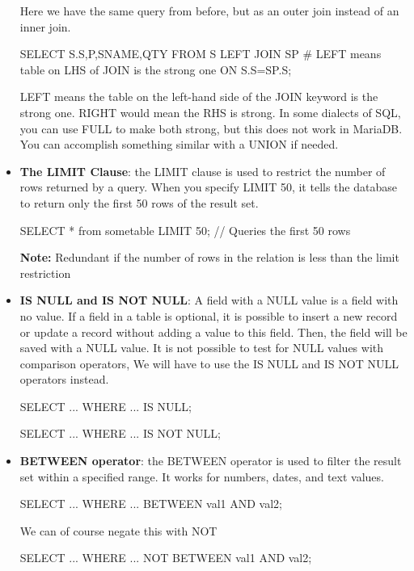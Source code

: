 \documentclass{report}
\begin{document}
\begin{itemize}
            Here we have the same query from before, but as an outer join instead of an inner join.
            \bigbreak \noindent 
            \begin{sqlcode}
                SELECT S.S,P,SNAME,QTY
                    FROM S LEFT JOIN SP # LEFT means table on LHS of JOIN is the strong one
                    ON S.S=SP.S;
            \end{sqlcode}
            \bigbreak \noindent 
            LEFT means the table on the left-hand side of the JOIN keyword is the strong one. RIGHT would mean the RHS is strong. In some dialects of SQL, you can use FULL to make both strong, but this does not work in MariaDB. You can accomplish something similar with a UNION if needed.
        \item \textbf{The LIMIT Clause}: the LIMIT clause is used to restrict the number of rows returned by a query. When you specify LIMIT 50, it tells the database to return only the first 50 rows of the result set.
            \bigbreak \noindent 
            \begin{sqlcode}
            SELECT * from sometable LIMIT 50; // Queries the first 50 rows
            \end{sqlcode}
            \bigbreak \noindent 
            \textbf{Note:} Redundant if the number of rows in the relation is less than the limit restriction
        \item \textbf{IS NULL and IS NOT NULL}: A field with a NULL value is a field with no value.
            \bigbreak \noindent 
            If a field in a table is optional, it is possible to insert a new record or update a record without adding a value to this field. Then, the field will be saved with a NULL value.
            \bigbreak \noindent 
            It is not possible to test for NULL values with comparison operators, We will have to use the IS NULL and IS NOT NULL operators instead.
            \bigbreak \noindent 
            \begin{sqlcode}
            SELECT ...
                WHERE ... IS NULL;

            SELECT ...
                WHERE ... IS NOT NULL;
            \end{sqlcode}
        \item \textbf{BETWEEN operator}: the BETWEEN operator is used to filter the result set within a specified range. It works for numbers, dates, and text values.
            \bigbreak \noindent 
            \begin{sqlcode}
            SELECT ...
                WHERE ... BETWEEN val1 AND val2;
            \end{sqlcode}
            \bigbreak \noindent 
            We can of course negate this with NOT
            \bigbreak \noindent 
            \begin{sqlcode}
            SELECT ...
                WHERE ... NOT BETWEEN val1 AND val2;
            \end{sqlcode}
    \end{itemize}
\end{document}
